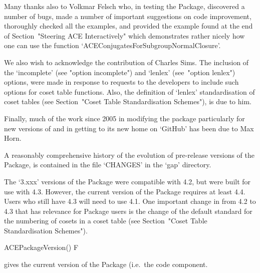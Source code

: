Many thanks also to Volkmar Felsch who, in testing the {\ACE} Package,
discovered a number of bugs, made a number of important suggestions on
code improvement, thoroughly checked all the  examples,  and  provided
the example found at the end of Section~"Steering  ACE  Interactively"
which  demonstrates  rather  nicely  how  one  can  use  the  function
`ACEConjugatesForSubgroupNormalClosure'.

We  also  wish  to  acknowledge the contribution of Charles Sims.  The
inclusion of the `incomplete' (see "option incomplete")  and  `lenlex'
(see~"option lenlex") options, were made in response  to  requests  to
the  {\GAP}  developers  to  include  such  options  for  coset  table
functions. Also, the definition of `lenlex' standardisation  of  coset
tables (see Section~"Coset Table Standardisation Schemes"), is due  to
him.

Finally, much of the work since 2005 in modifying the  {\ACE}  package
particularly for new versions of {\GAP} and in getting {\ACE}  to  its
new home on `GitHub' has been due to Max Horn.


A reasonably comprehensive history of  the  evolution  of  pre-release
versions of the {\ACE} Package, is contained in the file `CHANGES'  in
the `gap' directory. 

The `3.xxx' versions of the {\ACE} Package were compatible with {\GAP}
4.2, but were built for use with  {\GAP}  4.3.  However,  the  current
version of the {\ACE} Package requires at least {\GAP} 4.4. Users  who
still have {\GAP} 4.3 will need  to  use  {\ACE}  4.1.  One  important
change in {\GAP} from {\GAP} 4.2 to {\GAP} 4.3 that has relevance  for
{\ACE} Package users is the change of the  default  standard  for  the
numbering of  cosets  in  a  coset  table  (see  Section~"Coset  Table
Standardisation Schemes").

\>ACEPackageVersion() F

gives the current version of the {\ACE} Package (i.e.~the {\GAP}  code
component.


